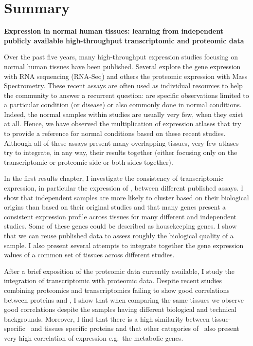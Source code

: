 \clearpage
\chapter*{Summary}
\label{ch:summary}

\begin{singlespace}

%

    \textbf{Expression in normal human tissues: learning from
    independent publicly available high-throughput transcriptomic and proteomic
    data}
    {\small Over the past five years, many high-throughput expression studies
    focusing on normal human tissues have been published. Several explore
    the gene expression with \gls{RNA} sequencing (\gls{RNA-Seq}) and others
    the proteomic expression with Mass Spectrometry. These recent assays are
    often used as individual resources to help the community to answer a
    recurrent question: are specific observations limited to a particular
    condition (or disease) or also commonly done in normal conditions.
    Indeed, the normal samples within studies are usually very few, when they
    exist at all. Hence, we have observed the multiplication of expression
    atlases that try to provide a reference for normal conditions based on
    these recent studies. Although all of these assays
    present many overlapping tissues, very few atlases try to integrate,
    in any way, their results together (either focusing only on the
    transcriptomic or proteomic side or both sides together).

    In the first results chapter, I investigate the consistency of
    transcriptomic expression, in particular the expression of \mRNAs,
    between different published assays. I show that independent samples are
    more likely to cluster based on their biological origins than based on
    their original studies and that many genes present a consistent expression
    profile across tissues for many different and independent studies. Some
    of these genes could be described as housekeeping genes. I show that we
    can reuse published data to assess roughly the biological quality of a
    sample. I also present several attempts to integrate together the gene
    expression values of a common set of tissues across different studies.

    After a brief exposition of the proteomic data currently available, I
    study the integration of transcriptomic with proteomic data. Despite
    recent studies combining proteomics and transcriptomics failing to show
    good correlations between proteins and \mRNAs, I show that when comparing
    the same tissues we observe good correlations despite the samples having
    different biological and technical backgrounds. Moreover, I find that
    there is a high similarity between tissue-specific \mRNAs\ and tissues
    specific proteins and that other categories of \mRNAs\ also present very
    high correlation of expression e.g.\ the metabolic genes.

}
\end{singlespace}
